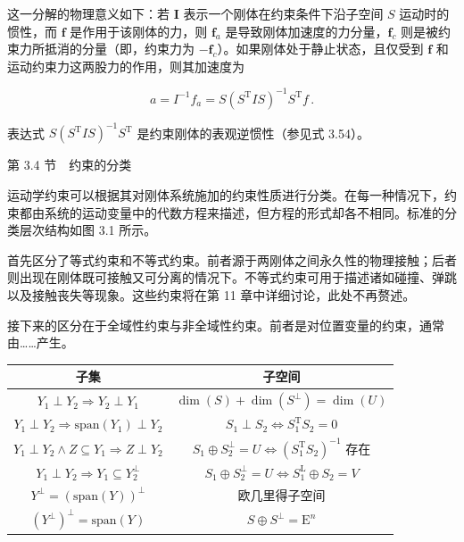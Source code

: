 \documentclass[10pt,a4paper]{book}
\theoremstyle{thmstyle} %
\theoremstyle{defstyle} %
\theoremstyle{prostyle} %
\begin{document}
这一分解的物理意义如下：若 $\mathbf{I}$ 表示一个刚体在约束条件下沿子空间 $S$ 运动时的惯性，而 $\mathbf{f}$ 是作用于该刚体的力，则 $\mathbf{f}_a$ 是导致刚体加速度的力分量，$\mathbf{f}_c$ 则是被约束力所抵消的分量（即，约束力为 $-\mathbf{f}_c$）。如果刚体处于静止状态，且仅受到 $\mathbf{f}$ 和运动约束力这两股力的作用，则其加速度为



$$
a = I ^{- 1} f _ { a } = S ( S ^{\mathrm { T} } I S ) ^{- 1} S ^{\mathrm { T} } f \, .
$$



表达式 $S(S^{\mathrm{T}}IS)^{-1}S^{\mathrm{T}}$ 是约束刚体的表观逆惯性（参见式 3.54）。



第 3.4 节　约束的分类



运动学约束可以根据其对刚体系统施加的约束性质进行分类。在每一种情况下，约束都由系统的运动变量中的代数方程来描述，但方程的形式却各不相同。标准的分类层次结构如图 3.1 所示。



首先区分了等式约束和不等式约束。前者源于两刚体之间永久性的物理接触；后者则出现在刚体既可接触又可分离的情况下。不等式约束可用于描述诸如碰撞、弹跳以及接触丧失等现象。这些约束将在第 11 章中详细讨论，此处不再赘述。



接下来的区分在于全域性约束与非全域性约束。前者是对位置变量的约束，通常由……产生。



\begin{table}[htbp]

\centering

\begin{tabular}{cc}

\toprule

子集 & 子空间 \\

\midrule

$Y_1 \perp Y_2 \Rightarrow Y_2 \perp Y_1$ & $\dim(S) + \dim(S^\perp) = \dim(U)$ \\

$Y_1 \perp Y_2 \Rightarrow \text{span}(Y_1) \perp Y_2$ & $S_1 \perp S_2 \Leftrightarrow S_1^\text{T} S_2 = 0$ \\

$Y_1 \perp Y_2 \land Z \subseteq Y_1 \Rightarrow Z \perp Y_2$ & $S_1 \oplus S_2^\perp = U \Leftrightarrow (S_1^\text{T} S_2)^{-1}$ 存在 \\

$Y_1 \perp Y_2 \Rightarrow Y_1 \subseteq Y_2^\perp$ & $S_1 \oplus S_2^\perp = U \Leftrightarrow S_1^\text{L} \oplus S_2 = V$ \\

$Y^\perp = (\text{span}(Y))^\perp$ & 欧几里得子空间 \\

$(Y^\perp)^\perp = \text{span}(Y)$ & $S \oplus S^\perp = \text{E}^n$ \\

\bottomrule

\end{tabular}

\end{table}
\end{document}
